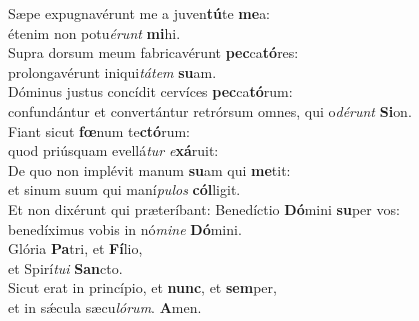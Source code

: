 \evenverse Sæpe expugnavérunt me a juven\textbf{tú}te \textbf{me}a:~\*\\
\evenverse étenim non potu\textit{é}\textit{runt} \textbf{mi}hi.\\
\oddverse Supra dorsum meum fabricavérunt \textbf{pec}ca\textbf{tó}res:~\*\\
\oddverse prolongavérunt iniqui\textit{tá}\textit{tem} \textbf{su}am.\\
\evenverse Dóminus justus concídit cervíces \textbf{pec}ca\textbf{tó}rum:~\*\\
\evenverse confundántur et convertántur retrórsum omnes, qui o\textit{dé}\textit{runt} \textbf{Si}on.\\
\oddverse Fiant sicut \textbf{fœ}num te\textbf{ctó}rum:~\*\\
\oddverse quod priúsquam evellá\textit{tur} \textit{e}\textbf{xá}ruit:\\
\evenverse De quo non implévit manum \textbf{su}am qui \textbf{me}tit:~\*\\
\evenverse et sinum suum qui maní\textit{pu}\textit{los} \textbf{cól}ligit.\\
\oddverse Et non dixérunt qui præteríbant: Benedíctio \textbf{Dó}mini \textbf{su}per vos:~\*\\
\oddverse benedíximus vobis in nó\textit{mi}\textit{ne} \textbf{Dó}mini.\\
\evenverse Glória \textbf{Pa}tri, et \textbf{Fí}lio,~\*\\
\evenverse et Spirí\textit{tu}\textit{i} \textbf{San}cto.\\
\oddverse Sicut erat in princípio, et \textbf{nunc}, et \textbf{sem}per,~\*\\
\oddverse et in sǽcula sæcu\textit{ló}\textit{rum}. \textbf{A}men.\\
